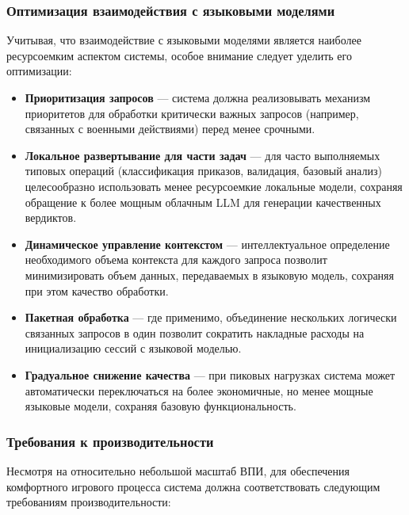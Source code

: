 \subsubsection{Оптимизация взаимодействия с языковыми моделями}

Учитывая, что взаимодействие с языковыми моделями является наиболее ресурсоемким аспектом системы, особое внимание следует уделить его оптимизации:

\begin{itemize}
    \item \textbf{Приоритизация запросов} — система должна реализовывать механизм приоритетов для обработки критически важных запросов (например, связанных с военными действиями) перед менее срочными.

    \item \textbf{Локальное развертывание для части задач} — для часто выполняемых типовых операций (классификация приказов, валидация, базовый анализ) целесообразно использовать менее ресурсоемкие локальные модели, сохраняя обращение к более мощным облачным LLM для генерации качественных вердиктов.

    \item \textbf{Динамическое управление контекстом} — интеллектуальное определение необходимого объема контекста для каждого запроса позволит минимизировать объем данных, передаваемых в языковую модель, сохраняя при этом качество обработки.

    \item \textbf{Пакетная обработка} — где применимо, объединение нескольких логически связанных запросов в один позволит сократить накладные расходы на инициализацию сессий с языковой моделью.

    \item \textbf{Градуальное снижение качества} — при пиковых нагрузках система может автоматически переключаться на более экономичные, но менее мощные языковые модели, сохраняя базовую функциональность.
\end{itemize}

\subsubsection{Требования к производительности}

Несмотря на относительно небольшой масштаб ВПИ, для обеспечения комфортного игрового процесса система должна соответствовать следующим требованиям производительности:

